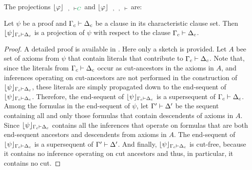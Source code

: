 \documentclass{llncs}
\begin{document}
\begin{example}
\noindent
The projections $\projectionO{\varphi}{\hC{B}, \hD{A} \seq \hE{C}}$ and $\projectionO{\varphi}{\hC{B}, \hD{A}, \hF{C} \seq}$ are:
\begin{small}
\begin{multicols}{2}{
\begin{prooftree}
				 
			 
							 
\end{prooftree}

\begin{prooftree}
					 
				 
									 
									 
\end{prooftree}
}
\end{multicols}
\end{small}
\hfill\QED
\end{example}

\begin{theorem}
Let $\psi$ be a proof and $\Gamma_c \seq \Delta_c$ be a clause in its characteristic clause set. Then $\projectionO{\psi}{\Gamma_c \seq \Delta_c}$ is a projection of $\psi$ with respect to the clause $\Gamma_c \seq \Delta_c$.
\end{theorem}
\begin{proof}
A detailed proof is available in \cite{ToDo}. Here only a sketch is provided. Let $A$ bee set of axioms from $\psi$ that contain literals that contribute to $\Gamma_c \seq \Delta_c$. Note that, since the literals from $\Gamma_c \seq \Delta_c$ occur as cut-ancestors in the axioms in $A$, and inferences operating on cut-ancestors are not performed in the construction of $\projectionO{\psi}{\Gamma_c \seq \Delta_c}$, these literals are simply propagated down to the end-sequent of $\projectionO{\psi}{\Gamma_c \seq \Delta_c}$. Therefore, the end-sequent of $\projectionO{\psi}{\Gamma_c \seq \Delta_c}$ is a supersequent of $\Gamma_c \seq \Delta_c$. Among the formulas in the end-sequent of $\psi$, let $\Gamma' \seq \Delta'$ be the sequent containing all and only those formulas that contain descendents of axioms in $A$. Since $\projectionO{\psi}{\Gamma_c \seq \Delta_c}$ contains all the inferences that operate on formulas that are both end-sequent ancestors and descendents from axioms in $A$. The end-sequent of $\projectionO{\psi}{\Gamma_c \seq \Delta_c}$ is a supersequent of $\Gamma' \seq \Delta'$. And finally, $\projectionO{\psi}{\Gamma_c \seq \Delta_c}$ is cut-free, because it contains no inference operating on cut ancestors and thus, in particular, it contains no cut.
\end{proof}
\end{document}
